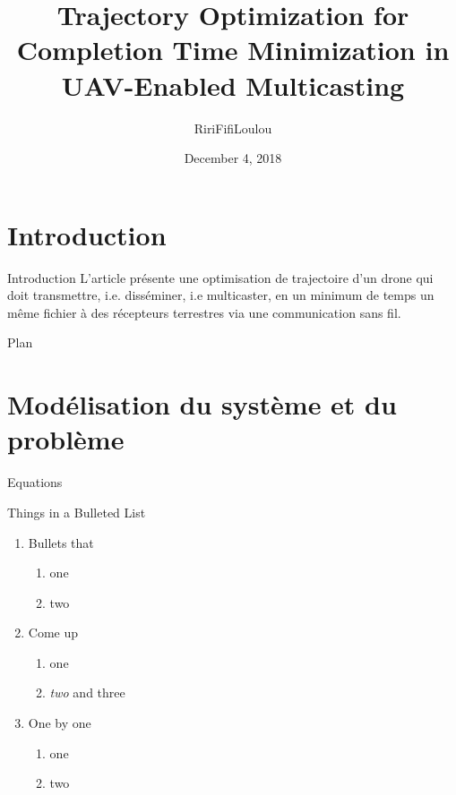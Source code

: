 \documentclass[utf8, a4paper]{beamer}
\title
  [Optimisation de trajectoire et du temps de mission d'un drone de télécommunication multicast.]
  {Trajectory Optimization for Completion Time Minimization in UAV-Enabled Multicasting}
\author
  [Toto]
  {Riri\quad Fifi\quad Loulou }
\date
  {December 4, 2018}
\institute
  {ENAC}
\begin{document}
\maketitle



\section {Introduction}

\begin{frame}
  {Introduction}
  L'article présente une optimisation de trajectoire d'un drone qui doit transmettre, i.e. disséminer, i.e multicaster,
  en un minimum de temps un même fichier à des récepteurs terrestres via une communication sans fil.

\end{frame}

\begin{frame}{Plan}

\tableofcontents

\end{frame}

\section{Modélisation du système et du problème}

\begin{frame}{Equations}

 Things in a Bulleted List\pause

\begin{enumerate}
	\item Bullets that
	\begin{enumerate}
		\item one
		\item two
	\end{enumerate}\pause
	\item Come up
	\begin{enumerate}
		\item one
		\item \emph{two} and three
	\end{enumerate}\pause
	\item One by one
	\begin{enumerate}
		\item one
		\item two
	\end{enumerate}
\end{enumerate}
\end{frame}
\end{document}
